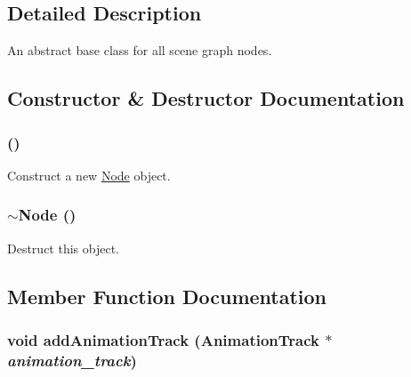 \subsection{Detailed Description}
An abstract base class for all scene graph nodes. 

\subsection{Constructor \& Destructor Documentation}
\hypertarget{classm3g_1_1Node_0d313fac56abd7ebe58a17f1530b879e}{
\subsubsection[{Node}]{ ()}}
\label{classm3g_1_1Node_0d313fac56abd7ebe58a17f1530b879e}


Construct a new \hyperlink{classm3g_1_1Node}{Node} object. \hypertarget{classm3g_1_1Node_6fa6bf60f34f1e3efb0e59333428c9c8}{
\subsubsection[{$\sim$Node}]{\setlength{\rightskip}{0pt plus 5cm}$\sim${\bf Node} ()}}
\label{classm3g_1_1Node_6fa6bf60f34f1e3efb0e59333428c9c8}


Destruct this object. 

\subsection{Member Function Documentation}
\hypertarget{classm3g_1_1Node_415c0b110f95410ded9b85e5d99a496b}{
\subsubsection[{addAnimationTrack}]{\setlength{\rightskip}{0pt plus 5cm}void addAnimationTrack ({\bf AnimationTrack} $\ast$ {\em animation\_\-track})}}
\label{classm3g_1_1Node_415c0b110f95410ded9b85e5d99a496b}


